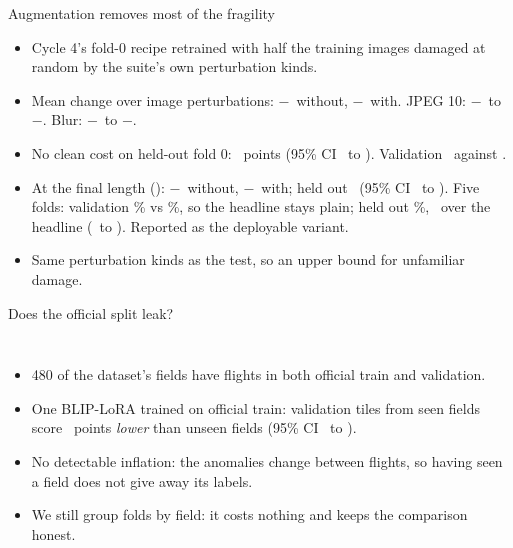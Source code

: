 \documentclass[aspectratio=169,10pt,t]{beamer}
\begin{document}
\begin{frame}{Augmentation removes most of the fragility}
\begin{itemize}
\item Cycle 4's fold-0 recipe retrained with half the training images damaged at random by the suite's own perturbation kinds.
\item Mean change over image perturbations: $-$\cFourPerturbed\ without, $-$\augFourPerturbed\ with. JPEG 10: $-$\cFourJpegDrop\ to $-$\augFourJpegDrop. Blur: $-$\cFourBlurDrop\ to $-$\augFourBlurDrop.
\item No clean cost on held-out fold 0: \augFourHeld\ points (95\% CI \augFourHeldLo\ to \augFourHeldHi). Validation \augFourVal\ against \augFourPlainVal.
\item At the final length (\finalPairs): $-$\cSixPerturbed\ without, $-$\augSixPerturbed\ with; held out \augSixHeld\ (95\% CI \augSixHeldLo\ to \augSixHeldHi). Five folds: validation \augFiveVal\% vs \finalVal\%, so the headline stays plain; held out \augFiveCorr\%, \augFiveChange\ over the headline (\augFiveChangeLo\ to \augFiveChangeHi). Reported as the deployable variant.
\item Same perturbation kinds as the test, so an upper bound for unfamiliar damage.
\end{itemize}
\end{frame}

\begin{frame}{Does the official split leak?}
\begin{columns}[T]
\resizebox{\textwidth}{!}{}
\begin{itemize}
\item 480 of the dataset's fields have flights in both official train and validation.
\item One BLIP-LoRA trained on official train: validation tiles from seen fields score \leakGap\ points \emph{lower} than unseen fields (95\% CI \leakLo\ to \leakHi).
\item No detectable inflation: the anomalies change between flights, so having seen a field does not give away its labels.
\item We still group folds by field: it costs nothing and keeps the comparison honest.
\end{itemize}
\end{columns}
\end{frame}
\end{document}
